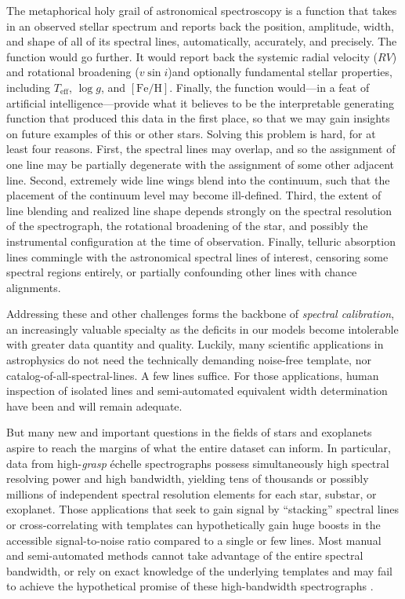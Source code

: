 \documentclass[twocolumn]{aastex631}
\begin{document}
The metaphorical holy grail of astronomical spectroscopy is a function that takes in an observed stellar spectrum and reports back the position, amplitude, width, and shape of all of its spectral lines, automatically, accurately, and precisely.  The function would go further. It would report back the systemic radial velocity ($RV$) and rotational broadening ($v\sin{i}$)and optionally fundamental stellar properties, including $T_{\mathrm{eff}}$, $\log{g}$, and $[\mathrm{Fe}/\mathrm{H}]$.  Finally, the function would---in a feat of artificial intelligence---provide what it believes to be the interpretable generating function that produced this data in the first place, so that we may gain insights on future examples of this or other stars.  Solving this problem is hard, for at least four reasons.  First, the spectral lines may overlap, and so the assignment of one line may be partially degenerate with the assignment of some other adjacent line.  Second, extremely wide line wings blend into the continuum, such that the placement of the continuum level may become ill-defined.  Third, the extent of line blending and realized line shape depends strongly on the spectral resolution of the spectrograph, the rotational broadening of the star, and possibly the instrumental configuration at the time of observation.  Finally, telluric absorption lines commingle with the astronomical spectral lines of interest, censoring some spectral regions entirely, or partially confounding other lines with chance alignments.

Addressing these and other challenges forms the backbone of \emph{spectral calibration}, an increasingly valuable specialty as the deficits in our models become intolerable with greater data quantity and quality.  Luckily, many scientific applications in astrophysics do not need the technically demanding noise-free template, nor catalog-of-all-spectral-lines.  A few lines suffice.  For those applications, human inspection of isolated lines and semi-automated equivalent width determination have been and will remain adequate.

But many new and important questions in the fields of stars and exoplanets aspire to reach the margins of what the entire dataset can inform.  In particular, data from high-\emph{grasp} \'echelle spectrographs possess simultaneously high spectral resolving power and high bandwidth, yielding tens of thousands or possibly millions of independent spectral resolution elements for each star, substar, or exoplanet.  Those applications that seek to gain signal by ``stacking'' spectral lines or cross-correlating with templates can hypothetically gain huge boosts in the accessible signal-to-noise ratio compared to a single or few lines.  Most manual and semi-automated methods cannot take advantage of the entire spectral bandwidth, or rely on exact knowledge of the underlying templates and may fail to achieve the hypothetical promise of these high-bandwidth spectrographs \citep{2020AJ....160..198H}.
\end{document}
